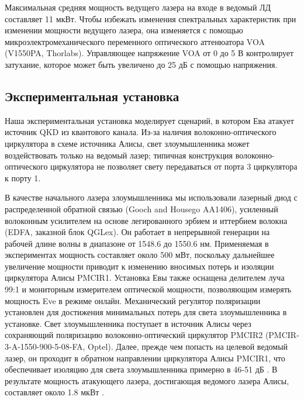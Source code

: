 Максимальная средняя мощность ведущего лазера на входе в ведомый ЛД составляет 11 мкВт. Чтобы избежать изменения спектральных характеристик при изменении мощности ведущего лазера, она изменяется с помощью микроэлектромеханического переменного оптического аттенюатора VOA (V1550PA, Thorlabs). Управляющее напряжение VOA от 0 до 5 В контролирует затухание, которое может быть увеличено до 25 дБ с помощью напряжения. 

\subsection{Экспериментальная установка}

Наша экспериментальная установка моделирует сценарий, в котором Ева атакует источник QKD из квантового канала. Из-за наличия волоконно-оптического циркулятора в схеме источника Алисы, свет злоумышленника может воздействовать только на ведомый лазер; типичная конструкция волоконно-оптического циркулятора не позволяет свету передаваться от порта 3 циркулятора к порту 1.

В качестве начального лазера злоумышленника мы использовали лазерный диод с распределенной обратной связью (Gooch and Housego AA1406), усиленный волоконным усилителем на основе легированного эрбием и иттербием волокна (EDFA, заказной блок QGLex)\cite{huang2020}. Он работает в непрерывной генерации на рабочей длине волны в диапазоне от 1548.6  до 1550.6 нм. Применяемая в экспериментах мощность составляет около 500 мВт, поскольку дальнейшее увеличение мощности приводит к изменению вносимых потерь и изоляции циркулятора Алисы PMCIR1. Установка Евы также оснащена делителем луча 99:1 и мониторным измерителем оптической мощности, позволяющим измерять мощность Eve в режиме онлайн. Механический регулятор поляризации установлен для достижения минимальных потерь для света злоумышленника в установке. Свет злоумышленника поступает в источник Алисы через сохраняющий поляризацию волоконно-оптический циркулятор PMCIR2 (PMCIR-3-A-1550-900-5-08-FA, Optel). Далее, прежде чем попасть на целевой ведомый лазер, он проходит в обратном направлении циркулятора Алисы PMCIR1, что обеспечивает изоляцию для света злоумышленника примерно в 46-51 дБ . В результате мощность атакующего лазера, достигающая ведомого лазера Алисы, составляет около 1.8 мкВт .

